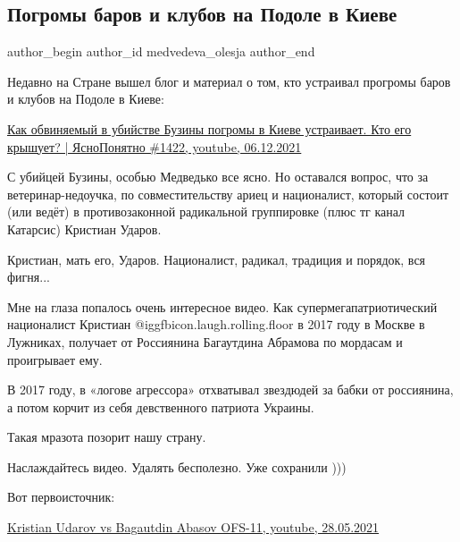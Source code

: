  
 
 
 
 
\subsection{Погромы баров и клубов на Подоле в Киеве}
\label{sec:09_12_2021.tg.medvedeva_olesja.2.pogrom_bar_podol_kiev}


\ifcmt
 author_begin
   author_id medvedeva_olesja
 author_end
\fi

Недавно на Стране вышел блог и материал о том, кто устраивал прогромы баров и
клубов на Подоле в Киеве: 

\href{https://youtu.be/BKmx3tdXdJU}{%
Как обвиняемый в убийстве Бузины погромы в Киеве устраивает. Кто его крышует? | ЯсноПонятно \#1422, %
youtube, 06.12.2021%
}

С убийцей Бузины, особью Медведько все ясно. Но оставался вопрос, что за
ветеринар-недоучка, по совместительству ариец и националист, который состоит
(или ведёт) в противозаконной радикальной группировке (плюс тг канал Катарсис)
Кристиан Ударов. 

Кристиан, мать его, Ударов. Националист, радикал, традиция и порядок, вся
фигня...

Мне на глаза попалось очень интересное видео. Как супермегапатриотический
националист Кристиан  @igg{fbicon.laugh.rolling.floor}  в 2017 году в Москве в
Лужниках, получает от Россиянина Багаутдина Абрамова по мордасам и проигрывает
ему.

В 2017 году, в «логове агрессора» отхватывал звездюдей за бабки от россиянина,
а потом корчит из себя девственного патриота Украины. 

Такая мразота позорит нашу страну. 

Наслаждайтесь видео. Удалять бесполезно. Уже сохранили )))

Вот первоисточник: 

\href{https://youtu.be/o2B1e1eZoH0}{%
Kristian Udarov vs Bagautdin Abasov OFS-11, youtube, 28.05.2021%
}
